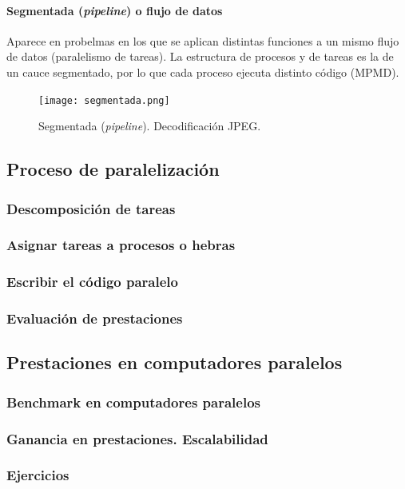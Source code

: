 \documentclass[12pt,spanish]{article}
\begin{document}
\paragraph{Segmentada (\textit{pipeline}) o flujo de datos}

Aparece en probelmas en los que se aplican distintas funciones a un mismo flujo de datos (paralelismo de tareas). La estructura de procesos y de tareas es la de un cauce segmentado, por lo que cada proceso ejecuta distinto código (MPMD).

\begin{figure}[H]
	\centering
	\texttt{[image: segmentada.png]}
	\caption{Segmentada (\textit{pipeline}). Decodificación JPEG.}
\end{figure}




\subsection{Proceso de paralelización}

\subsubsection{Descomposición de tareas}


\subsubsection{Asignar tareas a procesos o hebras}


\subsubsection{Escribir el código paralelo}


\subsubsection{Evaluación de prestaciones}



\subsection{Prestaciones en computadores paralelos}

\subsubsection{Benchmark en computadores paralelos}


\subsubsection{Ganancia en prestaciones. Escalabilidad}


\subsubsection{Ejercicios}
\end{document}

